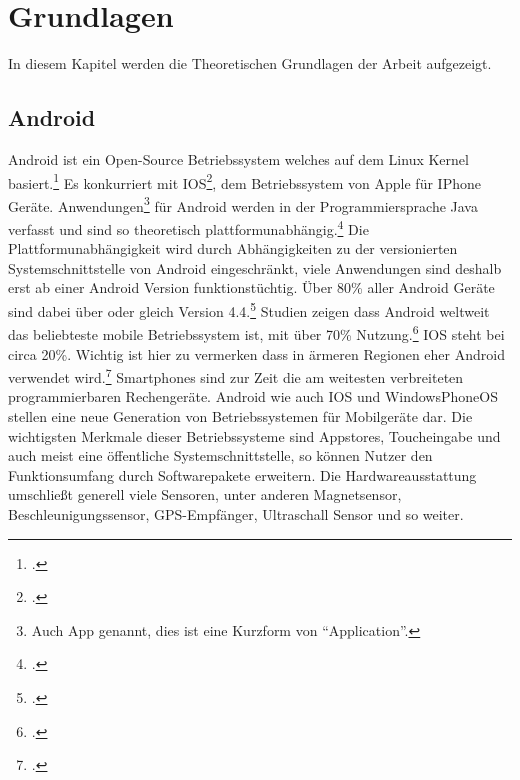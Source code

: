 \section{Grundlagen}
	In diesem Kapitel werden die Theoretischen Grundlagen der Arbeit aufgezeigt.
\subsection{Android}
	Android ist ein Open-Source Betriebssystem welches auf dem Linux Kernel basiert.\footcite{android} Es konkurriert mit IOS\footcite{ios}, dem Betriebssystem von Apple für IPhone Geräte. Anwendungen\footnote{Auch App genannt, dies ist eine Kurzform von \enquote{Application}.} für Android werden in der Programmiersprache Java verfasst und sind so theoretisch plattformunabhängig.\footcite{java} Die Plattformunabhängigkeit wird durch Abhängigkeiten zu der versionierten Systemschnittstelle von Android eingeschränkt, viele Anwendungen sind deshalb erst ab einer Android Version funktionstüchtig. Über 80\% aller Android Geräte sind dabei über oder gleich Version 4.4.\footcite{android-fragmentation}
	Studien zeigen dass Android weltweit das beliebteste mobile Betriebssystem ist, mit über 70\% Nutzung.\footcite[\url{http://gs.statcounter.com/\#mobile_os-ww-monthly-200812-201701}]{android-stats} IOS steht bei circa 20\%. Wichtig ist hier zu vermerken dass in ärmeren Regionen eher Android verwendet wird.\footcite[\url{http://gs.statcounter.com/\#mobile_os-ww-monthly-201701-201701-map}]{android-stats} Smartphones sind zur Zeit die am weitesten verbreiteten programmierbaren Rechengeräte.
	Android wie auch IOS und WindowsPhoneOS stellen eine neue Generation von Betriebssystemen für Mobilgeräte dar. Die wichtigsten Merkmale dieser Betriebssysteme sind Appstores, Toucheingabe und auch meist eine öffentliche Systemschnittstelle, so können Nutzer den Funktionsumfang durch Softwarepakete erweitern.
	Die Hardwareausstattung umschließt generell viele Sensoren, unter anderen Magnetsensor, Beschleunigungssensor, GPS-Empfänger, Ultraschall Sensor und so weiter.
